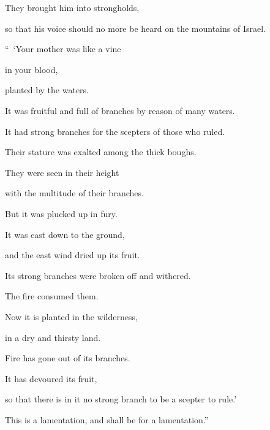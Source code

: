 {\par }{\Q They brought him into strongholds,
\par }{\QB so that his voice should no more be heard on the mountains of Israel.
\par }{\BB \par }{\Q {}“ ‘Your mother was like a vine
\par }{\QB in your blood,
\par }{\Q planted by the waters.
\par }{\QB It was fruitful and full of branches by reason of many waters.
\par }{\Q {}It had strong branches for the scepters of those who ruled.
\par }{\QB Their stature was exalted among the thick boughs.
\par }{\Q They were seen in their height
\par }{\QB with the multitude of their branches.
\par }{\Q {}But it was plucked up in fury.
\par }{\QB It was cast down to the ground,
\par }{\Q and the east wind dried up its fruit.
\par }{\QB Its strong branches were broken off and withered.
\par }{\QB The fire consumed them.
\par }{\Q {}Now it is planted in the wilderness,
\par }{\QB in a dry and thirsty land.
\par }{\Q {}Fire has gone out of its branches.
\par }{\QB It has devoured its fruit,
\par }{\QB so that there is in it no strong branch to be a scepter to rule.’
\par }{\MM This is a lamentation, and shall be for a lamentation.”

}
